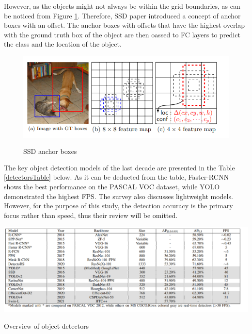 \documentclass[english, 12pt, a4paper, elec, utf8, a-1b, online]{aaltothesis}
\begin{document}
However, as the objects might not always be within the grid boundaries, as can be noticed from Figure \ref{ssd_boxes}. Therefore, SSD paper introduced a concept of anchor boxes with an offset. The anchor boxes with offsets that have the highest overlap with the ground truth box of the object are then oassed to FC layers to predict the class and the location of the object. 

\begin{figure}[htb]
	\begin{center}
		\includegraphics[width=12cm]{./ssd_boxes.png}
	\end{center}
	\caption{SSD anchor boxes\cite{Liu2015}}
	\begin{center}
		\label{ssd_boxes}
	\end{center}
\end{figure}
\FloatBarrier

The key object detection models of the last decade are presented \cite{Zaidi2021}  in the Table \ref{detectorsTable} below. As it can be deducted from the table, Faster-RCNN shows the best performance on the PASCAL VOC dataset, while YOLO demonstrated the highest FPS. The survey \cite{Zaidi2021} also discusses lightweight models. However, for the purpose of this study, the detection accuracy is the primary focus rather than speed, thus their review will be omitted. 

\begin{table}[htb]
	\begin{center}
		\includegraphics[width=16cm]{./detectorsTable.png}
	\end{center}
	\caption{Overview of object detectors\cite{Zaidi2021}}
	\begin{center}
		\label{detectorsTable}
	\end{center}
\end{table}
\FloatBarrier
\end{document}
